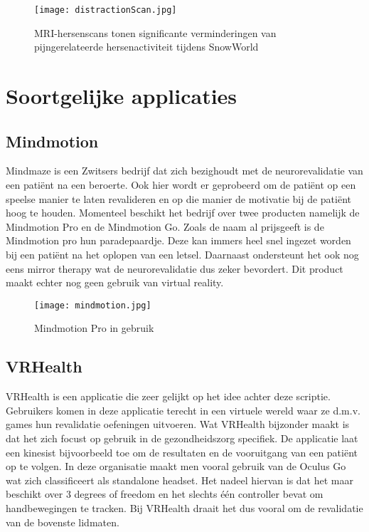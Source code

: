 \begin{figure}[h]
    \centering
    \texttt{[image: distractionScan.jpg]}
    \caption{MRI-hersenscans tonen significante verminderingen van pijngerelateerde hersenactiviteit tijdens SnowWorld \autocite{Washington2017}}
\end{figure}

\section{Soortgelijke applicaties}
\subsection{Mindmotion}
Mindmaze is een Zwitsers bedrijf dat zich bezighoudt met de neurorevalidatie van een patiënt na een beroerte. Ook hier wordt er geprobeerd om de patiënt op een speelse manier te laten revalideren en op die manier de motivatie bij de patiënt hoog te houden. Momenteel beschikt het bedrijf over twee producten namelijk de Mindmotion Pro en de Mindmotion Go. Zoals de naam al prijsgeeft is de Mindmotion pro hun paradepaardje. Deze kan immers heel snel ingezet worden bij een patiënt na het oplopen van een letsel. Daarnaast ondersteunt het ook nog eens mirror therapy wat de neurorevalidatie dus zeker bevordert. Dit product maakt echter nog geen gebruik van virtual reality.

\begin{figure}[h]
    \centering
    \texttt{[image: mindmotion.jpg]}
    \caption{Mindmotion Pro in gebruik}
\end{figure}

\subsection{VRHealth}
VRHealth is een applicatie die zeer gelijkt op het idee achter deze scriptie. Gebruikers komen in deze applicatie terecht in een virtuele wereld waar ze d.m.v. games hun revalidatie oefeningen uitvoeren. Wat VRHealth bijzonder maakt is dat het zich focust op gebruik in de gezondheidszorg specifiek. De applicatie laat een kinesist bijvoorbeeld toe om de resultaten en de vooruitgang van een patiënt op te volgen. In deze organisatie maakt men vooral gebruik van de Oculus Go wat zich classificeert als standalone headset. Het nadeel hiervan is dat het maar beschikt over 3 degrees of freedom en het slechts één controller bevat om handbewegingen te tracken. Bij VRHealth draait het dus vooral om de revalidatie van de bovenste lidmaten. 

